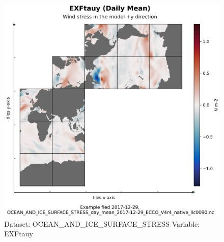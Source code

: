 \begin{figure}[H]
\centering
\includegraphics[scale=0.55]{../images/plots/native_plots/Ocean_and_Sea-Ice_Surface_Stress/EXFtauy.png}
\caption{Dataset: OCEAN\_AND\_ICE\_SURFACE\_STRESS Variable: EXFtauy}
\label{tab:table-OCEAN_AND_ICE_SURFACE_STRESS_EXFtauy-Plot}
\end{figure}
\pagebreak
